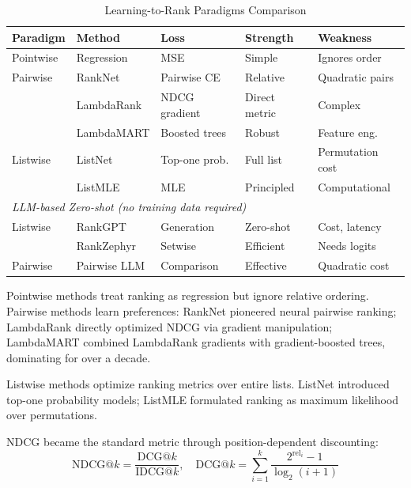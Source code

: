 \begin{table}[h]
\centering
\caption{Learning-to-Rank Paradigms Comparison}
\label{tab:ltr_paradigms}
\small
\begin{tabular}{lllll}
\toprule
\textbf{Paradigm} & \textbf{Method} & \textbf{Loss} & \textbf{Strength} & \textbf{Weakness} \\
\midrule
Pointwise & Regression & MSE & Simple & Ignores order \\
Pairwise & RankNet \cite{burges2005learning} & Pairwise CE & Relative & Quadratic pairs \\
 & LambdaRank \cite{burges2006learning} & NDCG gradient & Direct metric & Complex \\
 & LambdaMART \cite{burges2010ranknet} & Boosted trees & Robust & Feature eng. \\
Listwise & ListNet \cite{cao2007learning} & Top-one prob. & Full list & Permutation cost \\
 & ListMLE \cite{xia2008listwise} & MLE & Principled & Computational \\
\midrule
\multicolumn{5}{l}{\textit{LLM-based Zero-shot (no training data required)}} \\
Listwise & RankGPT \cite{sun2023chatgpt} & Generation & Zero-shot & Cost, latency \\
 & RankZephyr \cite{pradeep2023rankzephyr} & Setwise & Efficient & Needs logits \\
Pairwise & Pairwise LLM \cite{qin2023pairwise} & Comparison & Effective & Quadratic cost \\
\bottomrule
\end{tabular}
\end{table}

Pointwise methods treat ranking as regression but ignore relative ordering. Pairwise methods learn preferences: RankNet \cite{burges2005learning} pioneered neural pairwise ranking; LambdaRank \cite{burges2006learning} directly optimized NDCG via gradient manipulation; LambdaMART \cite{burges2010ranknet} combined LambdaRank gradients with gradient-boosted trees, dominating for over a decade.

Listwise methods optimize ranking metrics over entire lists. ListNet \cite{cao2007learning} introduced top-one probability models; ListMLE \cite{xia2008listwise} formulated ranking as maximum likelihood over permutations.

NDCG \cite{jarvelin2000ir, jarvelin2002cumulated} became the standard metric through position-dependent discounting:
\begin{equation}
\text{NDCG}@k = \frac{\text{DCG}@k}{\text{IDCG}@k}, \quad \text{DCG}@k = \sum_{i=1}^{k} \frac{2^{\text{rel}_i} - 1}{\log_2(i + 1)}
\end{equation}

